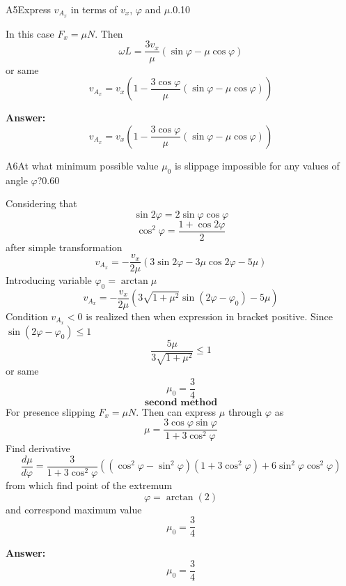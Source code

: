 \documentclass[11pt,a4paper]{article}
\begin{document}
\begin{solcard}{A5}{Express $v_{A_x}$ in terms of $v_x$, $\varphi$ and $\mu$.}{0.10}

In this case $F_x=\mu N$. Then $$\omega L=\frac{3v_x}{\mu}\left(\sin\varphi-\mu\cos\varphi\right) $$ or same $$v_{A_x}=v_x\left(1-\frac{3\cos\varphi}{\mu}\left(\sin\varphi-\mu\cos\varphi\right)\right) $$

\par\smallskip\noindent\textbf{Answer:} $$v_{A_x}=v_x\left(1-\frac{3\cos\varphi}{\mu}\left(\sin\varphi-\mu\cos\varphi\right)\right) $$
\end{solcard}

\begin{solcard}{A6}{At what minimum possible value $\mu_0$ is slippage impossible for any values of angle $\varphi$?}{0.60}

Considering that $$\sin2\varphi=2\sin\varphi\cos\varphi $$ $$\cos^2\varphi=\frac{1+\cos2\varphi}{2} $$ after simple transformation $$v_{A_x}=-\frac{v_x}{2\mu}\left(3\sin2\varphi-3\mu\cos2\varphi-5\mu\right) $$ Introducing variable $\varphi_0=\arctan\mu$ $$v_{A_x}=-\frac{v_x}{2\mu}\left(3\sqrt{1+\mu^2}\sin(2\varphi-\varphi_0)-5\mu\right) $$ Condition $v_{A_x}<0$ is realized then when expression in bracket positive. Since $\sin(2\varphi-\varphi_0)\leq{1}$ $$\frac{5\mu}{3\sqrt{1+\mu^2}}\leq{1} $$ or same $$\mu_0=\frac{3}{4} $$ $$\textbf{second method} $$ For presence slipping $F_x=\mu N$. Then can express $\mu$ through $\varphi$ as $$\mu=\frac{3\cos{\varphi}\sin{\varphi}}{1+3\cos^2{\varphi}} $$ Find derivative $$\frac{d\mu}{d\varphi}=\frac{3}{1+3\cos^2{\varphi}}\left((\cos^2{\varphi}-\sin^2{\varphi})(1+3\cos^2{\varphi})+6\sin^2{\varphi}\cos^2{\varphi}\right) $$ from which find point of the extremum $$\varphi=\arctan{(2)} $$ and correspond maximum value $$\mu_0=\frac{3}{4} $$

\par\smallskip\noindent\textbf{Answer:} $$\mu_0=\frac{3}{4} $$
\end{solcard}
\end{document}
